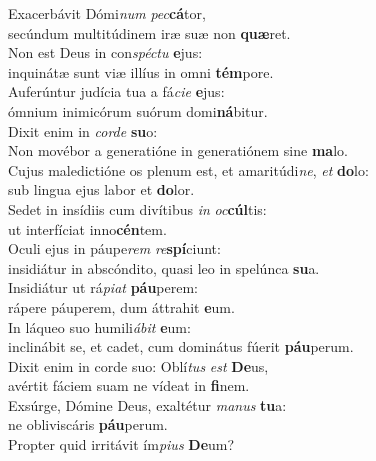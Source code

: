\oddverse Exacerbávit Dómi\textit{num} \textit{pec}\textbf{cá}tor,~\*\\
\oddverse secúndum multitúdinem iræ suæ non \textbf{quæ}ret.\\
\evenverse Non est Deus in con\textit{spé}\textit{ctu} \textbf{e}jus:~\*\\
\evenverse inquinátæ sunt viæ illíus in omni \textbf{tém}pore.\\
\oddverse Auferúntur judícia tua a fá\textit{ci}\textit{e} \textbf{e}jus:~\*\\
\oddverse ómnium inimicórum suórum domi\textbf{ná}bitur.\\
\evenverse Dixit enim in \textit{cor}\textit{de} \textbf{su}o:~\*\\
\evenverse Non movébor a generatióne in generatiónem sine \textbf{ma}lo.\\
\oddverse Cujus maledictióne os plenum est, et amaritúdi\textit{ne}, \textit{et} \textbf{do}lo:~\*\\
\oddverse sub lingua ejus labor et \textbf{do}lor.\\
\evenverse Sedet in insídiis cum divítibus \textit{in} \textit{oc}\textbf{cúl}tis:~\*\\
\evenverse ut interfíciat inno\textbf{cén}tem.\\
\oddverse Oculi ejus in páupe\textit{rem} \textit{re}\textbf{spí}ciunt:~\*\\
\oddverse insidiátur in abscóndito, quasi leo in spelúnca \textbf{su}a.\\
\evenverse Insidiátur ut rá\textit{pi}\textit{at} \textbf{páu}perem:~\*\\
\evenverse rápere páuperem, dum áttrahit \textbf{e}um.\\
\oddverse In láqueo suo humili\textit{á}\textit{bit} \textbf{e}um:~\*\\
\oddverse inclinábit se, et cadet, cum dominátus fúerit \textbf{páu}perum.\\
\evenverse Dixit enim in corde suo: Oblí\textit{tus} \textit{est} \textbf{De}us,~\*\\
\evenverse avértit fáciem suam ne vídeat in \textbf{fi}nem.\\
\oddverse Exsúrge, Dómine Deus, exaltétur \textit{ma}\textit{nus} \textbf{tu}a:~\*\\
\oddverse ne obliviscáris \textbf{páu}perum.\\
\evenverse Propter quid irritávit ím\textit{pi}\textit{us} \textbf{De}um?~\*\\
